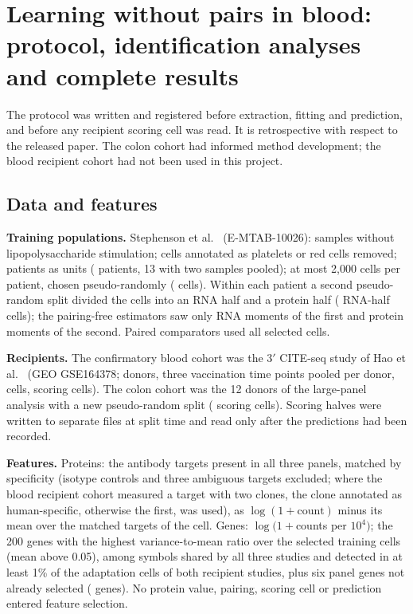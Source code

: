 \section{Learning without pairs in blood: protocol, identification analyses and complete results}\label{sec:cross}
The protocol was written and registered
before extraction, fitting and prediction, and before any recipient scoring
cell was read. It is retrospective with respect to the released paper. The
colon cohort had informed method development; the blood recipient cohort
\cite{hao2021} had not been used in this project.

\subsection*{Data and features}
\textbf{Training populations.} Stephenson et al.\ \cite{stephenson2021}
(E-MTAB-10026): samples without
lipopolysaccharide stimulation; cells annotated as platelets or red cells
removed; patients as units (\XsPatients{} patients, 13 with two samples
pooled); at most 2,000 cells per patient, chosen pseudo-randomly
(\XsTrainCells{} cells). Within each patient a second pseudo-random split divided the cells
into an RNA half and a protein half (\XsHalfCells{} RNA-half cells); the
pairing-free estimators saw only RNA moments of the first and protein moments
of the second. Paired comparators used all selected cells.

\textbf{Recipients.} The confirmatory blood cohort was the 3$'$ CITE-seq study of
Hao et al.\ \cite{hao2021} (GEO GSE164378; \XsHaoDonors{} donors, three
vaccination time points pooled per donor, \XsHaoCells{} cells,
\XsHaoScoring{} scoring cells). The colon cohort was the 12 donors of the
large-panel analysis with a new pseudo-random split (\XsColonScoring{} scoring cells).
Scoring halves were written to separate files at split time and read only
after the predictions had been recorded.

\textbf{Features.} Proteins: the \XsProteins{} antibody targets present in all
three panels, matched by specificity (isotype controls and three ambiguous
targets excluded; where the blood recipient cohort measured a target with two
clones, the clone annotated as human-specific, otherwise the first, was used),
as $\log(1+\text{count})$ minus its mean over the matched targets of the
cell. Genes: $\log(1+{}$counts per $10^4)$; the 200 genes with the highest
variance-to-mean ratio over the selected training cells (mean above 0.05),
among symbols shared by all three studies and detected in at least 1\% of the
adaptation cells of both recipient studies, plus six panel genes not already
selected (\XsGenes{} genes). No protein value, pairing, scoring cell or
prediction entered feature selection.

